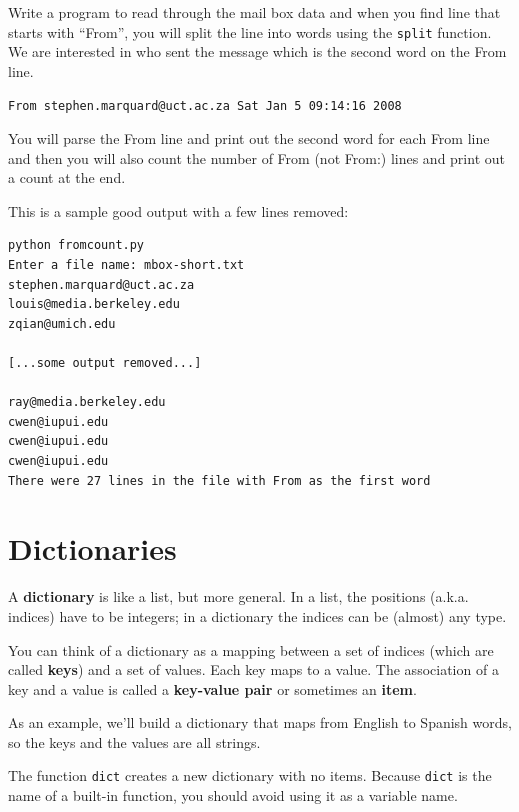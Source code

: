 \documentclass[10pt]{book}
\begin{document}
\begin{ex}
Write a program to read through the mail box data and when you find 
line that starts with ``From'', you will split the line into 
words using the {\tt split} function. We are interested in 
who sent the message which is the second word on the From line.

{\tt From stephen.marquard@uct.ac.za Sat Jan  5 09:14:16 2008 }

You will parse the From line and print out the second word for 
each From line and then you will also count the number of 
From (not From:) lines and print out a count at the end.

This is a sample good output with a few lines removed:

\beforeverb
\begin{verbatim}
python fromcount.py 
Enter a file name: mbox-short.txt
stephen.marquard@uct.ac.za
louis@media.berkeley.edu
zqian@umich.edu

[...some output removed...]

ray@media.berkeley.edu
cwen@iupui.edu
cwen@iupui.edu
cwen@iupui.edu
There were 27 lines in the file with From as the first word
\end{verbatim}
\afterverb

\end{ex}


\chapter{Dictionaries}


A {\bf dictionary} is like a list, but more general.  In a list,
the positions (a.k.a. indices) have to be integers; in a dictionary 
the indices can be (almost) any type.

You can think of a dictionary as a mapping between a set of indices
(which are called {\bf keys}) and a set of values.  Each key maps to a
value.  The association of a key and a value is called a {\bf
  key-value pair} or sometimes an {\bf item}.

As an example, we'll build a dictionary that maps from English
to Spanish words, so the keys and the values are all strings.

The function {\tt dict} creates a new dictionary with no items.
Because {\tt dict} is the name of a built-in function, you
should avoid using it as a variable name.
\end{document}
